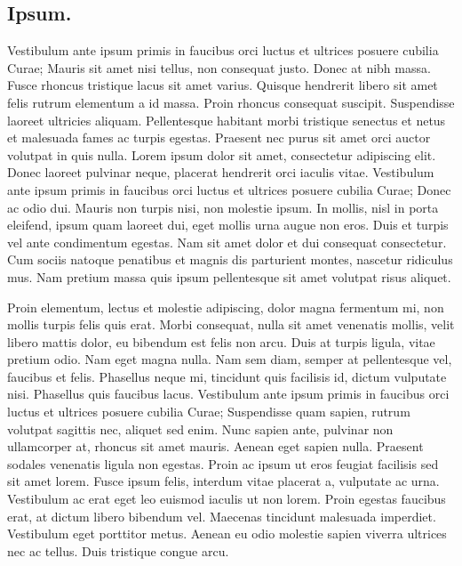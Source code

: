 \subsection{Ipsum.}

    Vestibulum ante ipsum primis in faucibus orci luctus et ultrices posuere 
    cubilia Curae; Mauris sit amet nisi tellus, non consequat justo. Donec at 
    nibh massa. Fusce rhoncus tristique lacus sit amet varius. Quisque hendrerit 
    libero sit amet felis rutrum elementum a id massa. Proin rhoncus consequat 
    suscipit. Suspendisse laoreet ultricies aliquam. Pellentesque habitant morbi 
    tristique senectus et netus et malesuada fames ac turpis egestas. Praesent 
    nec purus sit amet orci auctor volutpat in quis nulla. Lorem ipsum dolor sit 
    amet, consectetur adipiscing elit. Donec laoreet pulvinar neque, placerat 
    hendrerit orci iaculis vitae. Vestibulum ante ipsum primis in faucibus orci 
    luctus et ultrices posuere cubilia Curae; Donec ac odio dui. Mauris non turpis 
    nisi, non molestie ipsum. In mollis, nisl in porta eleifend, ipsum quam 
    laoreet dui, eget mollis urna augue non eros. Duis et turpis vel ante 
    condimentum egestas. Nam sit amet dolor et dui consequat consectetur. Cum 
    sociis natoque penatibus et magnis dis parturient montes, nascetur ridiculus 
    mus. Nam pretium massa quis ipsum pellentesque sit amet volutpat risus aliquet.

    Proin elementum, lectus et molestie adipiscing, dolor magna fermentum mi, non 
    mollis turpis felis quis erat. Morbi consequat, nulla sit amet venenatis mollis, 
    velit libero mattis dolor, eu bibendum est felis non arcu. Duis at turpis ligula, 
    vitae pretium odio. Nam eget magna nulla. Nam sem diam, semper at pellentesque 
    vel, faucibus et felis. Phasellus neque mi, tincidunt quis facilisis id, dictum 
    vulputate nisi. Phasellus quis faucibus lacus. Vestibulum ante ipsum primis in 
    faucibus orci luctus et ultrices posuere cubilia Curae; Suspendisse quam sapien, 
    rutrum volutpat sagittis nec, aliquet sed enim. Nunc sapien ante, pulvinar non 
    ullamcorper at, rhoncus sit amet mauris. Aenean eget sapien nulla. Praesent 
    sodales venenatis ligula non egestas. Proin ac ipsum ut eros feugiat facilisis sed 
    sit amet lorem. Fusce ipsum felis, interdum vitae placerat a, vulputate ac urna. 
    Vestibulum ac erat eget leo euismod iaculis ut non lorem. Proin egestas faucibus 
    erat, at dictum libero bibendum vel. Maecenas tincidunt malesuada imperdiet. 
    Vestibulum eget porttitor metus. Aenean eu odio molestie sapien viverra ultrices 
    nec ac tellus. Duis tristique congue arcu.

